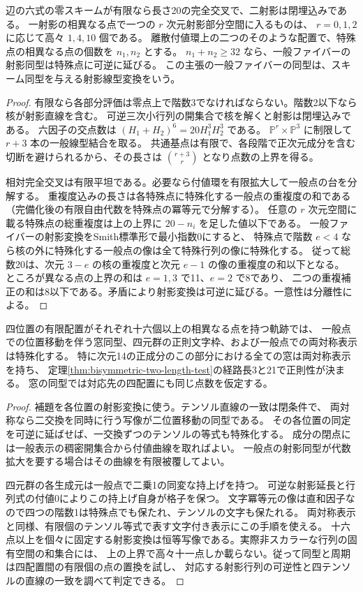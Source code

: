 \begin{lemma}\label{lem:stable-twenty-frames}
辺の六式の零スキームが有限なら長さ20の完全交叉で、二射影は閉埋込みである。
一射影の相異なる点で一つの $r$ 次元射影部分空間に入るものは、
$r=0,1,2$ に応じて高々 $1,4,10$ 個である。
離散付値環上の二つのそのような配置で、特殊点の相異なる点の個数を $n_1,n_2$ とする。
$n_1+n_2\ge32$ なら、一般ファイバーの射影同型は特殊点に可逆に延びる。
この主張の一般ファイバーの同型は、スキーム同型を与える射影線型変換をいう。
\end{lemma}
\begin{proof}
有限なら各部分評価は零点上で階数3でなければならない。階数2以下なら核が射影直線を含む。
可逆三次小行列の開集合で核を解くと射影は閉埋込みである。
六因子の交点数は $(H_1+H_2)^6=20H_1^3H_2^3$ である。
$\mathbb P^r\times\mathbb P^3$ に制限して $r+3$ 本の一般線型結合を取る。
共通基点は有限で、各段階で正次元成分を含む切断を避けられるから、その長さは
$\binom{r+3}{r}$ となり点数の上界を得る。

相対完全交叉は有限平坦である。必要なら付値環を有限拡大して一般点の台を分解する。
重複度込みの長さは各特殊点に特殊化する一般点の重複度の和である
（完備化後の有限自由代数を特殊点の冪等元で分解する）。
任意の $r$ 次元空間に載る特殊点の総重複度は上の上界に $20-n_i$ を足した値以下である。
一般ファイバーの射影変換をSmith標準形で最小指数0にすると、
特殊点で階数 $e<4$ なら核の外に特殊化する一般点の像は全て特殊行列の像に特殊化する。
従って総数20は、次元 $3-e$ の核の重複度と次元 $e-1$ の像の重複度の和以下となる。
ところが異なる点の上界の和は $e=1,3$ で11、$e=2$ で8であり、
二つの重複補正の和は8以下である。矛盾により射影変換は可逆に延びる。一意性は分離性による。
\end{proof}

\begin{proposition}\label{prop:stable-component-markings}
四位置の有限配置がそれぞれ十六個以上の相異なる点を持つ軌跡では、
一般点での位置移動を伴う窓同型、四元群の正則文字枠、および一般点での両対称表示は特殊化する。
特に次元14の正成分のこの部分における全ての窓は両対称表示を持ち、
定理\ref{thm:bisymmetric-two-length-test}の経路長3と21で正則性が決まる。
窓の同型では対応先の四配置にも同じ点数を仮定する。
\end{proposition}
\begin{proof}
補題を各位置の射影変換に使う。テンソル直線の一致は閉条件で、
両対称なら二交換を同時に行う写像が二位置移動の同型である。
その各位置の同定を可逆に延ばせば、一交換ずつのテンソルの等式も特殊化する。
成分の閉点には一般表示の稠密開集合から付値曲線を取ればよい。
一般点の射影同型が代数拡大を要する場合はその曲線を有限被覆してよい。

四元群の各生成元は一般点で二乗1の同変な持上げを持つ。
可逆な射影延長と行列式の付値0によりこの持上げ自身が格子を保つ。
文字冪等元の像は直和因子なので四つの階数1は特殊点でも保たれ、テンソルの文字も保たれる。
両対称表示と同様、有限個のテンソル等式で表す文字付き表示にこの手順を使える。
十六点以上を個々に固定する射影変換は恒等写像である。実際非スカラーな行列の固有空間の和集合には、
上の上界で高々十一点しか載らない。従って同型と周期は四配置間の有限個の点の置換を試し、
対応する射影行列の可逆性と四テンソルの直線の一致を調べて判定できる。
\end{proof}

